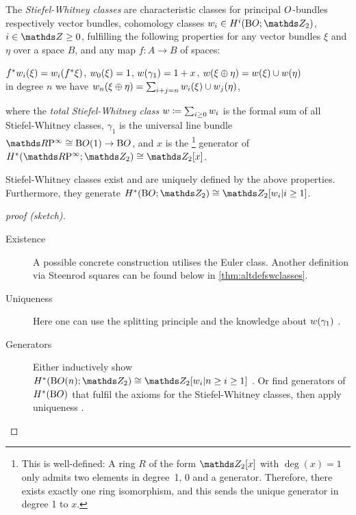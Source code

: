 \begin{Def}\label{def:swclasses}
  The \emph{Stiefel-Whitney classes} are
  characteristic classes for principal $O$-bundles
  respectively vector bundles,
  \idest cohomology classes
  $\ws{i}\in \H^i(\BO;\Zmod2)$, $i\in\Z\geq0$,
  fulfilling the following properties for any vector bundles $\xi$ and
  $\eta$ over a space $B$, and any map $f\colon A\to B$ of spaces:
  \begin{axioms}
  \axiom[Naturality] ${f}^*{w_{i}}(\xi) = {w_{i}}({f}^* \xi)$,
  \axiom ${w_{0}}(\xi)=1$,
  \axiom ${w}(\gamma_1) = 1 + x$,
  \axiom[Multiplicativity]\label{tag:swclassesmultiplicativity}
  ${w}(\xi \oplus \eta) = {w}(\xi)\cup {w}(\eta)$
    \\\idest in degree $n$ we have
    ${w_{n}}(\xi\oplus\eta) = \sum_{i+j=n}{w_{i}}(\xi) \cup {w_{j}}(\eta)$,
  \end{axioms}
  where the \emph{total Stiefel-Whitney class}
  $w\coloneqq\sum_{i\geq 0}w_{i}$ is the formal sum of all
  Stiefel-Whitney classes,
  $\gamma_1$ is the universal line bundle $\RPinf\cong\BO(1)\to\BO$,
  and $x$ is the%
  \footnote{
    This is well-defined: A ring $R$ of the form $\Zmod2[x]$
    with $\deg(x)=1$ only admits two elements in degree~1, $0$ and a
    generator. Therefore, there exists exactly one ring
    isomorphism, and this sends the unique generator in
    degree 1 to $x$.
  }
  generator of $\H^*(\RPinf;\Zmod2)\cong\Zmod2[x]$.
\end{Def}

\begin{Thm}
  Stiefel-Whitney classes exist and are uniquely defined by the above
  properties. Furthermore, they generate $\H^*(\BO;\Zmod2)\cong \Zmod2[\ws{i}|i\geq1]$.
  \begin{proof}[proof (sketch)]
    \begin{description}
    \item[Existence]
      A possible concrete construction utilises the Euler
      class. Another definition via Steenrod squares can be 
      found below in \autoref{thm:altdefswclasses}.
    \item[Uniqueness]
      Here one can use the splitting principle and the knowledge about
      ${w}(\gamma_1)$
      \cite[Uniqueness Theorem~7.3]{milnor}.
    \item[Generators]
      Either inductively show
      $\H^*(\BO(n);\Zmod2)\cong \Zmod2[\ws{i}|n\geq i\geq1]$
      \cite[Theorem~7.1~ff.]{milnor}.
      Or find generators of $H^*(\mathrm{B}O)$ that fulfil the axioms for
      the Stiefel-Whitney classes, then apply uniqueness
      \cite[Chap.~7.6]{may}.
    \end{description}
  \end{proof}
\end{Thm}

